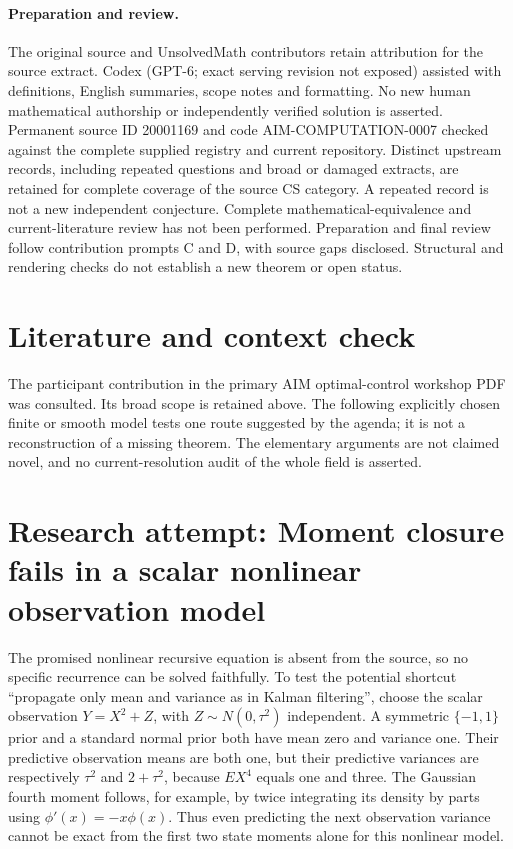 \documentclass[11pt]{article}
\begin{document}
\paragraph{Preparation and review.}
The original source and UnsolvedMath contributors retain attribution for the source extract. Codex (GPT-6; exact serving revision not exposed) assisted with definitions, English summaries, scope notes and formatting. No new human mathematical authorship or independently verified solution is asserted. Permanent source ID 20001169 and code AIM-COMPUTATION-0007 checked against the complete supplied registry and current repository. Distinct upstream records, including repeated questions and broad or damaged extracts, are retained for complete coverage of the source CS category. A repeated record is not a new independent conjecture. Complete mathematical-equivalence and current-literature review has not been performed. Preparation and final review follow contribution prompts C and D, with source gaps disclosed. Structural and rendering checks do not establish a new theorem or open status.
\label{end:20001169}

\section{Literature and context check}
The participant contribution in the primary AIM optimal-control workshop
 PDF was consulted. Its broad scope is retained above. The following explicitly
 chosen finite or smooth model tests one route suggested by the agenda; it is
 not a reconstruction of a missing theorem. The elementary arguments are not
 claimed novel, and no current-resolution audit of the whole field is asserted.
\section{Research attempt: Moment closure fails in a scalar nonlinear observation model}
The promised nonlinear recursive equation is absent from the source, so no
specific recurrence can be solved faithfully. To test the potential shortcut
``propagate only mean and variance as in Kalman filtering'', choose the scalar
observation $Y=X^2+Z$, with $Z\sim N(0,\tau^2)$ independent.
A symmetric $\{ -1,1\}$ prior and a standard normal prior both have mean zero
and variance one. Their predictive observation means are both one, but their
predictive variances are respectively $\tau^2$ and $2+\tau^2$, because
$E X^4$ equals one and three. The Gaussian fourth moment follows, for example,
by twice integrating its density by parts using $\phi'(x)=-x\phi(x)$.
Thus even predicting the next observation variance cannot be exact from the
first two state moments alone for this nonlinear model.
\end{document}
